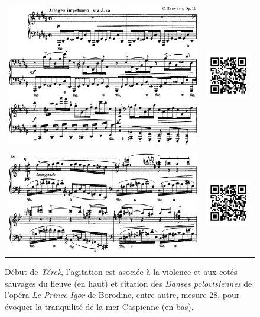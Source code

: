 \begin{figure}[!p]
  \begin{bigcenter}
    \begin{tabular}{lr}
      \vspace*{0.0cm}
      \includegraphics[width=12.5cm, keepaspectratio]{op-11-iv-1.png}
      &
      \includegraphics[width=3cm, keepaspectratio]{op-11-iv-qr.png}
      \\
      \vspace{0.5cm} &
      \\
      \includegraphics[width=12.5cm, keepaspectratio]{op-11-iv-2.png}
      &
      \includegraphics[width=3cm, keepaspectratio]{op-11-iv-qr.png}
    \end{tabular}
  \end{bigcenter}
  \caption{\label{op11-iv}Début de \emph{Térek}, l'agitation est asociée à la violence et aux cotés sauvages du fleuve (en haut) et citation des \emph{Danses polovtsiennes} de l'opéra \emph{Le Prince Igor} de Borodine, entre autre, mesure 28, pour évoquer la tranquilité de la mer Caspienne (en bas).}
\end{figure}

